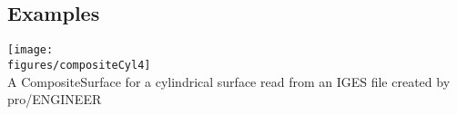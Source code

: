 
\subsection{Examples}
% 
  \begin{center}
   \texttt{[image: \\figures/compositeCyl4]} \\
  {A CompositeSurface for a cylindrical surface read from an IGES file created by pro/ENGINEER}
  \end{center}
